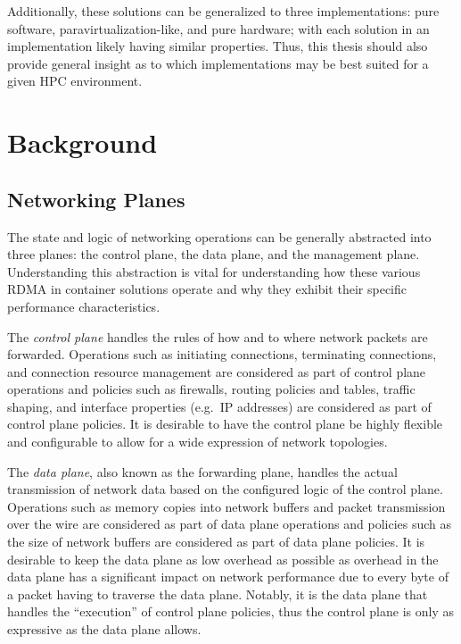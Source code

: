 \documentclass[12pt,titlepage]{article}
\begin{document}
Additionally, these solutions can be generalized to three implementations: pure software, paravirtualization-like, and pure hardware;
with each solution in an implementation likely having similar properties.
Thus, this thesis should also provide general insight as to which implementations may be best suited for a given HPC environment.


\section{Background}
\subsection{Networking Planes}\label{subsec:Networking Planes}
The state and logic of networking operations can be generally abstracted into three planes: the control plane, the data plane, and the management plane.
Understanding this abstraction is vital for understanding how these various RDMA in container solutions operate and why they exhibit their specific performance characteristics.

The \textit{control plane} handles the rules of how and to where network packets are forwarded.
Operations such as initiating connections, terminating connections, and connection resource management are considered as part of control plane operations and policies such as firewalls, routing policies and tables, traffic shaping, and interface properties (e.g.\ IP addresses) are considered as part of control plane policies.
It is desirable to have the control plane be highly flexible and configurable to allow for a wide expression of network topologies.

The \textit{data plane}, also known as the forwarding plane, handles the actual transmission of network data based on the configured logic of the control plane.
Operations such as memory copies into network buffers and packet transmission over the wire are considered as part of data plane operations and policies such as the size of network buffers are considered as part of data plane policies.
It is desirable to keep the data plane as low overhead as possible as overhead in the data plane has a significant impact on network performance due to every byte of a packet having to traverse the data plane.
Notably, it is the data plane that handles the ``execution'' of control plane policies, thus the control plane is only as expressive as the data plane allows.
\end{document}
